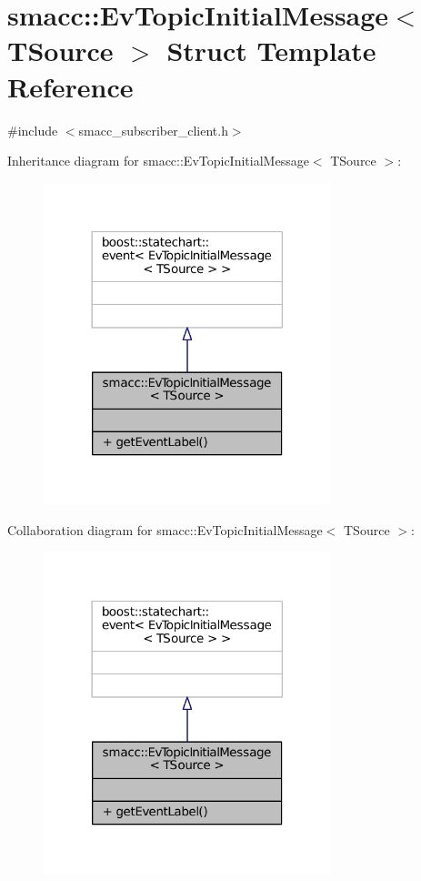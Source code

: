 \hypertarget{structsmacc_1_1EvTopicInitialMessage}{}\section{smacc\+:\+:Ev\+Topic\+Initial\+Message$<$ T\+Source $>$ Struct Template Reference}
\label{structsmacc_1_1EvTopicInitialMessage}


{\ttfamily \#include $<$smacc\+\_\+subscriber\+\_\+client.\+h$>$}



Inheritance diagram for smacc\+:\+:Ev\+Topic\+Initial\+Message$<$ T\+Source $>$\+:
\nopagebreak
\begin{figure}[H]
\begin{center}
\leavevmode
\includegraphics[width=237pt]{structsmacc_1_1EvTopicInitialMessage__inherit__graph}
\end{center}
\end{figure}


Collaboration diagram for smacc\+:\+:Ev\+Topic\+Initial\+Message$<$ T\+Source $>$\+:
\nopagebreak
\begin{figure}[H]
\begin{center}
\leavevmode
\includegraphics[width=237pt]{structsmacc_1_1EvTopicInitialMessage__coll__graph}
\end{center}
\end{figure}
